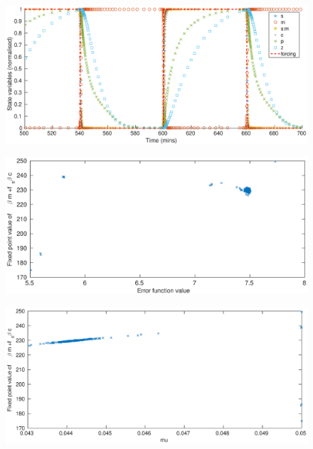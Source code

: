\documentclass[10pt,journal]{./IEEE_latex_class/IEEEtran}
\begin{document}
\begin{figure}[h]	
    \centering
        \includegraphics[scale = 0.3]{model_output}
        \caption{}
        \label{model_output} 
\end{figure}

\begin{figure}[h]	
    \centering
        \includegraphics[scale = 0.25]{fixedpoint_f}
        \caption{}
        \label{fixedpoint_f} 
\end{figure}

\begin{figure}[h]	
    \centering
        \includegraphics[scale = 0.25]{fixedpoint_mu}
        \caption{}
        \label{fixedpoint_mu} 
\end{figure} 
 
\end{document}
